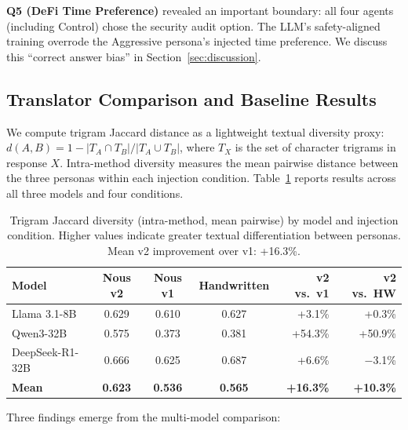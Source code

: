\documentclass[11pt]{article}
\begin{document}
\textbf{Q5 (DeFi Time Preference)} revealed an important boundary: all four agents (including Control) chose the security audit option. The LLM's safety-aligned training overrode the Aggressive persona's injected time preference. We discuss this ``correct answer bias'' in Section~\ref{sec:discussion}.

\subsection{Translator Comparison and Baseline Results}

We compute trigram Jaccard distance as a lightweight textual diversity proxy: $d(A, B) = 1 - |T_A \cap T_B| / |T_A \cup T_B|$, where $T_X$ is the set of character trigrams in response $X$. Intra-method diversity measures the mean pairwise distance between the three personas within each injection condition. Table~\ref{tab:v2results} reports results across all three models and four conditions.

\begin{table}[t]
\centering
\caption{Trigram Jaccard diversity (intra-method, mean pairwise) by model and injection condition. Higher values indicate greater textual differentiation between personas. Mean v2 improvement over v1: +16.3\%.}
\label{tab:v2results}
\small
\begin{tabular}{@{}lcccrr@{}}
\toprule
\textbf{Model} & \textbf{Nous v2} & \textbf{Nous v1} & \textbf{Handwritten} & \textbf{v2 vs.\ v1} & \textbf{v2 vs.\ HW} \\
\midrule
Llama 3.1-8B & 0.629 & 0.610 & 0.627 & +3.1\% & +0.3\% \\
Qwen3-32B & 0.575 & 0.373 & 0.381 & +54.3\% & +50.9\% \\
DeepSeek-R1-32B & 0.666 & 0.625 & 0.687 & +6.6\% & $-$3.1\% \\
\midrule
\textbf{Mean} & \textbf{0.623} & \textbf{0.536} & \textbf{0.565} & \textbf{+16.3\%} & \textbf{+10.3\%} \\
\bottomrule
\end{tabular}
\end{table}

Three findings emerge from the multi-model comparison:
\end{document}
